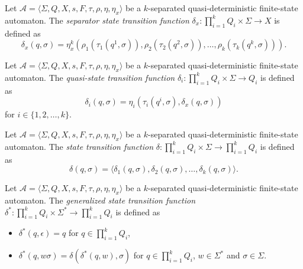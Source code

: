 \begin{definition}
  Let $\mathcal{A} = \langle \Sigma, Q, X, s, F, \tau, \rho, \eta, \eta_x \rangle$ be
  a $k$-separated quasi-deterministic finite-state automaton. The \emph{separator
  state transition function} $\delta_x : \prod_{i=1}^k Q_i \times \Sigma \rightarrow X$
  is defined as
  \begin{equation*}
    \delta_x(q, \sigma) = \eta_x^k(\rho_1(\tau_1(q^1, \sigma)), \rho_2(\tau_2(q^2,
    \sigma)), \ldots, \rho_k(\tau_k(q^k, \sigma))).
  \end{equation*}
\end{definition}

\begin{definition}
  Let $\mathcal{A} = \langle \Sigma, Q, X, s, F, \tau, \rho, \eta, \eta_x \rangle$ be
  a $k$-separated quasi-deterministic finite-state automaton. The \emph{quasi-state
  transition function} $\delta_i : \prod_{i=1}^k Q_i \times \Sigma \rightarrow Q_i$ is
  defined as
  \begin{equation*}
    \delta_i(q, \sigma) = \eta_i(\tau_i(q^i, \sigma), \delta_x(q, \sigma))
  \end{equation*}
  for $i \in \{ 1, 2, \ldots, k \}$.
\end{definition}

\begin{definition}\label{definition:quasidet_delta}
  Let $\mathcal{A} = \langle \Sigma, Q, X, s, F, \tau, \rho, \eta, \eta_x \rangle$
  be a $k$-separated quasi-deterministic finite-state automaton. The \emph{state
  transition function} $\delta : \prod_{i=1}^k Q_i \times \Sigma \rightarrow
  \prod_{i=1}^k Q_i$ is defined as
  \begin{equation*}
    \delta(q, \sigma) = \langle \delta_1(q, \sigma), \delta_2(q, \sigma), \ldots,
    \delta_k(q, \sigma) \rangle.
  \end{equation*}
\end{definition}

\begin{definition}
  Let $\mathcal{A} = \langle \Sigma, Q, X, s, F, \tau, \rho, \eta, \eta_x \rangle$
  be a $k$-separated quasi-deterministic finite-state automaton. The
  \emph{generalized state transition function} $\delta^* : \prod_{i=1}^k Q_i \times
  \Sigma^* \rightarrow \prod_{i=1}^k Q_i$ is defined as
  \begin{itemize}
    \item $\delta^*(q, \epsilon) = q$ for $q \in \prod_{i=1}^k Q_i$,
    \item $\delta^*(q, w\sigma) = \delta(\delta^*(q, w), \sigma)$ for $q \in
            \prod_{i=1}^k Q_i$, $w \in \Sigma^*$ and $\sigma \in \Sigma$.
  \end{itemize}
\end{definition}

